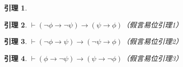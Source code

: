 \documentclass[punct=custom/kaiming,fontset=none]{ctexart}
\makeatletter
\renewenvironment{proof}[1][\proofname]{\par
  \pushQED{\qed}%
  \normalfont \topsep6\p@\@plus6\p@\relax
  \trivlist
  \item[\hskip\labelsep
    \bfseries
    #1%
    ]\ignorespaces
}{%
  \popQED\endtrivlist\@endpefalse
}
\newtheorem*{lemma*}{引理}
\theoremstyle{remark}
\let\proves\vdash
\makeatother
\begin{document}
\begin{description}
\begin{lemma*}
\begin{proof}
\begin{ND}
        \label{4}
        \label{5}
      \end{ND}
    \end{proof}
  \end{lemma*}
  \begin{lemma*}
    \label{lem:contrapose1}
    \(\proves (\neg\phi \to \neg\psi) \to (\psi \to \phi)\)\hfill（假言易位引理1）
    \begin{proof}
      \leavevmode
      \begin{ND}
        \label{1}
        \label{2}
        \label{3}
      \end{ND}
    \end{proof}
  \end{lemma*}
  \begin{lemma*}
    \label{lem:contrapose2}
    \(\proves (\neg\phi \to \psi) \to (\neg\psi \to \phi)\)\hfill（假言易位引理2）
    \begin{proof}
      \leavevmode
      \begin{ND}
        \label{1}
        \label{2}
        \label{3}
      \end{ND}
    \end{proof}
  \end{lemma*}
  \begin{lemma*}
    \label{lem:contrapose3}
    \(\proves (\phi \to \neg\psi) \to (\psi \to \neg\phi)\)\hfill（假言易位引理3）
    \begin{proof}
      \leavevmode
      \begin{ND}
        \label{1}

\end{ND}
\end{proof}
\end{lemma*}
\end{description}
\end{document}
